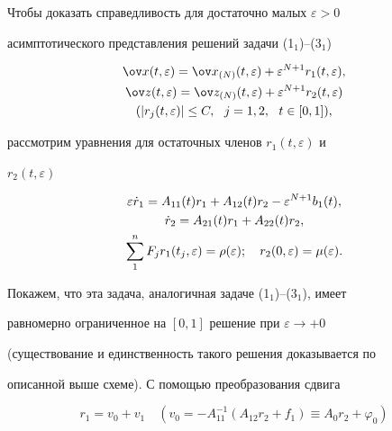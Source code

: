  


Чтобы доказать справедливость для достаточно малых $\varepsilon>0$ 


асимптотического представления решений задачи (1$_1$)--(3$_1$) 


\begin{gather} 


\ov x(t,\varepsilon)=\ov x_{(N)}(t,\varepsilon)+ 


\varepsilon^{N+1}r_1(t,\varepsilon),\notag \\ 


\ov z(t,\varepsilon)=\ov z_{(N)}(t,\varepsilon)+ 


\varepsilon^{N+1}r_2(t,\varepsilon) \\ 


(|r_j(t,\varepsilon)|\le C,\ \ j=1,2,\ \ t\in[0,1]),\notag 


\end{gather} 


рассмотрим уравнения для остаточных членов $r_1(t,\varepsilon)$ и 


$r_2(t,\varepsilon)$ 


\begin{gather} 


\varepsilon\Dot r_1=A_{11}(t)r_1+A_{12}(t)r_2- 


\varepsilon^{N+1}b_1(t),\notag \\ 


\Dot r_2=A_{21}(t)r_1+A_{22}(t)r_2,\\ 


\sum^n_1 F_j r_1(t_j,\varepsilon)=\rho(\varepsilon);\quad 


r_2(0,\varepsilon)=\mu(\varepsilon).\notag 


\end{gather} 


 


Покажем, что эта задача, аналогичная задаче (1$_1$)--(3$_1$), имеет 


равномерно ограниченное на $[0,1]$ решение при $\varepsilon\to+0$ 


(существование и единственность такого решения доказывается по 


описанной выше схеме). С помощью преобразования сдвига 


$$ 


r_1=v_0+v_1\quad (v_0=-A^{-1}_{11}(A_{12}r_2+f_1) 


\equiv A_0r_2+\varphi_0)


$$ 


